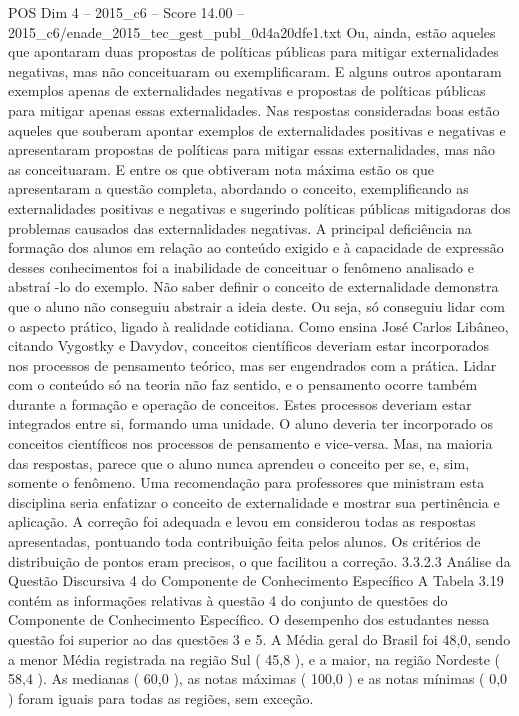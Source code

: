\begin{textsample}{POS Dim 4 – 2015\_c6 – Score 14.00 – 2015\_c6/enade\_2015\_tec\_gest\_publ\_0d4a20dfe1.txt}
Ou, ainda, estão aqueles que apontaram duas propostas de políticas públicas para mitigar externalidades negativas, mas não conceituaram ou exemplificaram.
E alguns outros apontaram exemplos apenas de externalidades negativas e propostas de políticas públicas para mitigar apenas essas externalidades.
Nas respostas consideradas boas estão aqueles que souberam apontar exemplos de externalidades positivas e negativas e apresentaram propostas de políticas para mitigar essas externalidades, mas não as conceituaram.
E entre os que obtiveram nota máxima estão os que apresentaram a questão completa, abordando o conceito, exemplificando as externalidades positivas e negativas e sugerindo políticas públicas mitigadoras dos problemas causados das externalidades negativas.
A principal deficiência na formação dos alunos em relação ao conteúdo exigido e à capacidade de expressão desses conhecimentos foi a inabilidade de conceituar o fenômeno analisado e abstraí -lo do exemplo.
Não saber definir o conceito de externalidade demonstra que o aluno não conseguiu abstrair a ideia deste.
Ou seja, só conseguiu lidar com o aspecto prático, ligado à realidade cotidiana.
Como ensina José Carlos Libâneo, citando Vygostky e Davydov, conceitos científicos deveriam estar incorporados nos processos de pensamento teórico, mas ser engendrados com a prática.
Lidar com o conteúdo só na teoria não faz sentido, e o pensamento ocorre também durante a formação e operação de conceitos.
Estes processos deveriam estar integrados entre si, formando uma unidade.
O aluno deveria ter incorporado os conceitos científicos nos processos de pensamento e vice-versa.
Mas, na maioria das respostas, parece que o aluno nunca aprendeu o conceito per se, e, sim, somente o fenômeno.
Uma recomendação para professores que ministram esta disciplina seria enfatizar o conceito de externalidade e mostrar sua pertinência e aplicação.
A correção foi adequada e levou em considerou todas as respostas apresentadas, pontuando toda contribuição feita pelos alunos.
Os critérios de distribuição de pontos eram precisos, o que facilitou a correção. 3.3.2.3 Análise da Questão Discursiva 4 do Componente de Conhecimento Específico A Tabela 3.19 contém as informações relativas à questão 4 do conjunto de questões do Componente de Conhecimento Específico.
O desempenho dos estudantes nessa questão foi superior ao das questões 3 e 5.
A Média geral do Brasil foi 48,0, sendo a menor Média registrada na região Sul ( 45,8 ), e a maior, na região Nordeste ( 58,4 ).
As medianas ( 60,0 ), as notas máximas ( 100,0 ) e as notas mínimas ( 0,0 ) foram iguais para todas as regiões, sem exceção.

\end{textsample}
